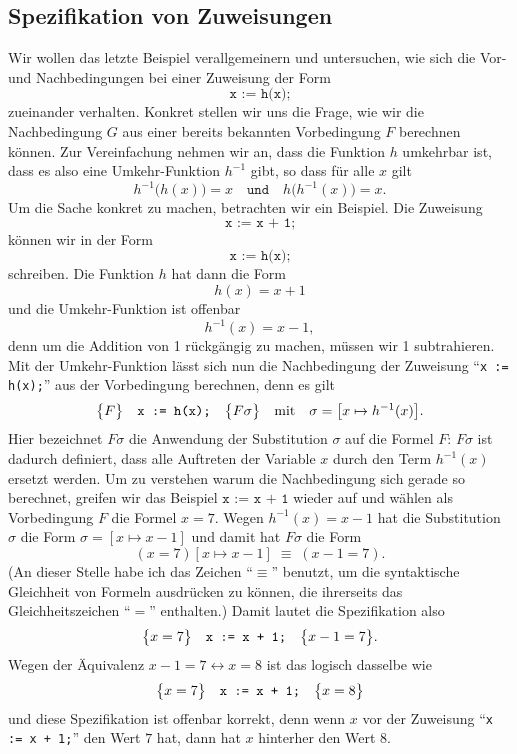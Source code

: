 \subsection{Spezifikation von Zuweisungen}
Wir wollen das letzte Beispiel verallgemeinern und untersuchen, wie sich die Vor- und
Nachbedingungen bei einer Zuweisung der Form 
\[ \texttt{x := h(x);} \]
zueinander verhalten.  Konkret stellen wir uns die Frage, wie wir die Nachbedingung $G$
aus einer bereits bekannten Vorbedingung $F$ berechnen k\"onnen.  Zur Vereinfachung nehmen
wir an, dass die Funktion $h$ umkehrbar ist, dass es also eine Umkehr-Funktion $h^{-1}$ gibt,
so dass f\"ur alle $x$ gilt 
\[ h^{-1}\bigl(h(x)\bigr) = x \quad \mathtt{und} \quad h\bigl(h^{-1}(x)\bigr) = x. \]
Um die Sache konkret zu machen, betrachten wir ein Beispiel.  Die Zuweisung 
\[ \texttt{x := x + 1;} \]
k\"onnen wir in der Form 
\[ \texttt{x := h(x);} \]
schreiben. Die Funktion $h$ hat dann die Form 
\[ h(x) = x + 1 \]
und die Umkehr-Funktion  ist offenbar 
\[ h^{-1}(x) = x - 1, \]
denn um die Addition von 1 r\"uckg\"angig zu machen, m\"ussen wir 1 subtrahieren.
Mit der Umkehr-Funktion l\"asst sich nun die Nachbedingung der Zuweisung ``\texttt{x := h(x);}'' aus der
Vorbedingung berechnen, denn es gilt
\[ \bigl\{F\bigr\}\quad\texttt{x := h(x);}\quad\bigl\{F\sigma\bigr\} \quad \mathrm{mit} \quad \sigma = \bigl[x \mapsto h^{-1}(x)\bigr]. \]
Hier bezeichnet $F\sigma$ die Anwendung der Substitution
$\sigma$ auf die Formel $F$: $F\sigma$ ist
dadurch definiert, dass alle Auftreten der Variable $x$ durch den Term $h^{-1}(x)$ ersetzt
werden.  Um zu verstehen warum die Nachbedingung sich gerade so berechnet, greifen wir das
Beispiel $\texttt{x := x + 1}$ wieder auf und w\"ahlen als Vorbedingung $F$ die Formel 
$x = 7$.  Wegen $h^{-1}(x) = x - 1$ hat die Substitution $\sigma$ die Form
$\sigma = [ x \mapsto x - 1 ]$ und damit hat $F\sigma$ die Form 
\[ (x = 7)[x \mapsto x - 1] \;\equiv\; (x - 1 = 7). \]
(An dieser Stelle habe ich das Zeichen ``$\equiv$'' benutzt, um die syntaktische Gleichheit
von Formeln ausdr\"ucken zu k\"onnen, die ihrerseits das Gleichheitszeichen ``$=$''
enthalten.)  Damit lautet die Spezifikation also 
\[ \bigl\{x = 7\bigr\}\quad\texttt{x := x + 1;}\quad\bigl\{x - 1 = 7\bigr\}. \]
Wegen der Äquivalenz $x - 1 = 7 \leftrightarrow x = 8$ ist das logisch dasselbe wie
\[ \bigl\{x = 7\bigr\}\quad\texttt{x := x + 1;}\quad\bigl\{x = 8\bigr\} \]
und diese Spezifikation ist offenbar korrekt, denn wenn $x$ vor der Zuweisung
``\texttt{x := x + 1;}'' den Wert $7$ hat, dann hat $x$ hinterher den Wert 8.

